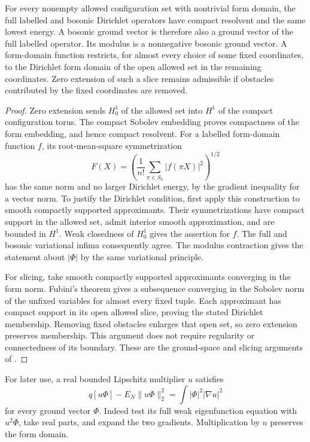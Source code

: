 \begin{lemma}\label{set:ground-space}
For every nonempty allowed configuration set with nontrivial form domain,
the full labelled and bosonic Dirichlet operators have compact resolvent
and the same lowest energy. A bosonic ground vector is therefore also a
ground vector of the full labelled operator. Its modulus is a
nonnegative bosonic ground vector. A form-domain function restricts, for
almost every choice of some fixed coordinates, to the Dirichlet form
domain of the open allowed set in the remaining coordinates. Zero
extension of such a slice remains admissible if obstacles contributed
by the fixed coordinates are removed.
\end{lemma}

\begin{proof}
Zero extension sends $H_0^1$ of the allowed set into $H^1$ of the compact
configuration torus. The compact Sobolev embedding proves compactness
of the form embedding, and hence compact resolvent. For a labelled
form-domain function $f$, its root-mean-square symmetrization
\[
 F(X)=\left(\frac1{n!}\sum_{\pi\in S_n}|f(\pi X)|^2\right)^{1/2}
\]
has the same norm and no larger Dirichlet energy, by the gradient
inequality for a vector norm. To justify the Dirichlet condition, first
apply this construction to smooth compactly supported approximants.
Their symmetrizations have compact support in the allowed set, admit
interior smooth approximation, and are bounded in $H^1$. Weak closedness
of $H_0^1$ gives the assertion for $f$. The full and bosonic variational
infima consequently agree. The modulus contraction gives the statement
about $|\Phi|$ by the same variational principle.

For slicing, take smooth compactly supported approximants converging in
the form norm. Fubini's theorem gives a subsequence converging in the
Sobolev norm of the unfixed variables for almost every fixed tuple.
Each approximant has compact support in its open allowed slice, proving
the stated Dirichlet membership. Removing fixed obstacles enlarges that
open set, so zero extension preserves membership. This argument does
not require regularity or connectedness of its boundary. These are the
ground-space and slicing arguments of \cite[Lemmas 2.1 and 2.2]{H}.
\end{proof}

For later use, a real bounded Lipschitz multiplier $u$ satisfies
\begin{equation}\label{set:multiplier}
 q[u\Phi]-E_N\|u\Phi\|_2^2
       =\int |\Phi|^2|\nabla u|^2
\end{equation}
for every ground vector $\Phi$. Indeed test its full weak eigenfunction
equation with $u^2\Phi$, take real parts, and expand the two gradients.
Multiplication by $u$ preserves the form domain.

